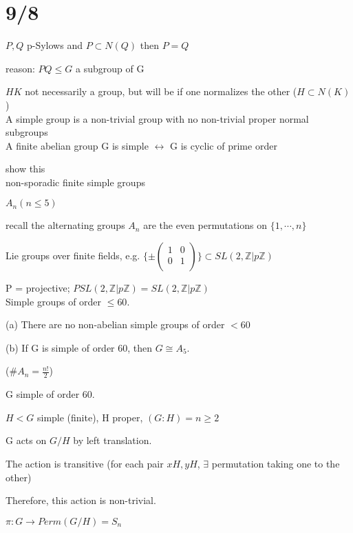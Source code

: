 \documentclass[12pt]{article}
\begin{document}
\section{9/8}

\noindent
$P, Q$ p-Sylows and $P \subset N(Q)$ then $P = Q$

reason: $PQ \leq G$ a subgroup of G

$HK$ not necessarily a group, but will be if one normalizes the other ($H \subset N(K)$)\\

\noindent
A simple group is a non-trivial group with no non-trivial proper normal subgroups\\

\noindent
A finite abelian group G is simple $\leftrightarrow$ G is cyclic of prime order

show this\\

\noindent
non-sporadic finite simple groups

$A_n (n \leq 5)$

recall the alternating groups $A_n$ are the even permutations on $\{1, \cdots, n\}$

Lie groups over finite fields, e.g. $\{\pm \begin{pmatrix} 1 & 0 \\ 0 & 1 \\ \end{pmatrix}\} \subset SL(2, \mathds{Z}|p\mathds{Z})$

P = projective; $PSL(2, \mathds{Z}|p\mathds{Z}) = SL(2, \mathds{Z}|p\mathds{Z})$\\

\noindent
Simple groups of order $\leq 60$.

(a) There are no non-abelian simple groups of order $< 60$

(b) If G is simple of order 60, then $G \cong A_5$.

($\#A_n = \frac{n!}{2}$)

\noindent
G simple of order 60.

$H < G$ simple (finite), H proper, $(G: H) = n \geq 2$

G acts on $G\slash H$ by left translation.

The action is transitive (for each pair $xH, yH$, $\exists$ permutation taking one to the other)

Therefore, this action is non-trivial.

$\pi : G \to Perm(G\slash H) = S_n$
\end{document}
